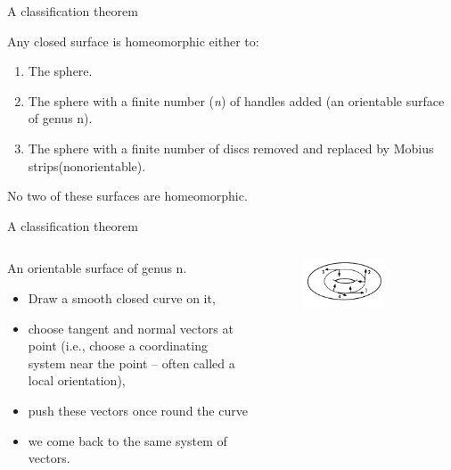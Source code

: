 \documentclass{beamer}
\begin{document}
\begin{frame}{A classification theorem}
  \begin{theorem}
    Any closed surface is homeomorphic either to:
    \begin{enumerate}[label={(\alph*)}]
    \item The sphere.
    \item The sphere with a finite number (\textsl{n}) of handles added (an orientable surface of genus n).
    \item The sphere with a finite number of discs removed and replaced by Mobius strips(nonorientable).
    \end{enumerate}
    No two of these surfaces are homeomorphic.
  \end{theorem}
\end{frame}

\begin{frame}{A classification theorem}
  \begin{columns}
    \begin{column}{0.6\textwidth}
      \begin{block}{}
        An orientable surface of genus n.
        \begin{itemize}
        \item Draw a smooth closed curve on it,
        \item choose tangent and normal vectors at point (i.e., choose a coordinating system near the point -- often called a local orientation),
        \item push these vectors once round the curve
        \item we come back to the same system of vectors.
        \end{itemize}
      \end{block}
    \end{column}
    \begin{column}{0.4\textwidth}
      \begin{figure}
        \centering
        \includegraphics[width=0.7\textwidth]{figure_1_19_a.png}
        \caption{}
      \end{figure}
    \end{column}
  \end{columns}
\end{frame}
\end{document}
